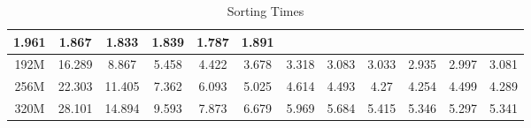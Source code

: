 \documentclass[11pt]{article}
\begin{document}
\begin{table}[htbp]
{\begin{tabular}{@{}|c|ccccccccccc|@{}}
                \multicolumn{1}{c|}{1.961} &
                \multicolumn{1}{c|}{1.867} &
                \multicolumn{1}{c|}{1.833} &
                \multicolumn{1}{c|}{1.839} &
                \multicolumn{1}{c|}{1.787} &
                1.891 \\ \midrule
                192M &
                \multicolumn{1}{c|}{16.289} &
                \multicolumn{1}{c|}{8.867} &
                \multicolumn{1}{c|}{5.458} &
                \multicolumn{1}{c|}{4.422} &
                \multicolumn{1}{c|}{3.678} &
                \multicolumn{1}{c|}{3.318} &
                \multicolumn{1}{c|}{3.083} &
                \multicolumn{1}{c|}{3.033} &
                \multicolumn{1}{c|}{2.935} &
                \multicolumn{1}{c|}{2.997} &
                3.081 \\ \midrule
                256M &
                \multicolumn{1}{c|}{22.303} &
                \multicolumn{1}{c|}{11.405} &
                \multicolumn{1}{c|}{7.362} &
                \multicolumn{1}{c|}{6.093} &
                \multicolumn{1}{c|}{5.025} &
                \multicolumn{1}{c|}{4.614} &
                \multicolumn{1}{c|}{4.493} &
                \multicolumn{1}{c|}{4.27} &
                \multicolumn{1}{c|}{4.254} &
                \multicolumn{1}{c|}{4.499} &
                4.289 \\ \midrule
                320M &
                \multicolumn{1}{c|}{28.101} &
                \multicolumn{1}{c|}{14.894} &
                \multicolumn{1}{c|}{9.593} &
                \multicolumn{1}{c|}{7.873} &
                \multicolumn{1}{c|}{6.679} &
                \multicolumn{1}{c|}{5.969} &
                \multicolumn{1}{c|}{5.684} &
                \multicolumn{1}{c|}{5.415} &
                \multicolumn{1}{c|}{5.346} &
                \multicolumn{1}{c|}{5.297} &
                5.341 \\ \bottomrule
            \end{tabular}%
        }
        \caption{Sorting Times}
        \label{tab:sorting-times}
    \end{table}
\end{document}
